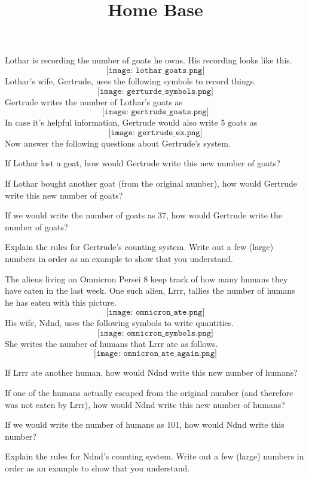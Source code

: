 \documentclass[handout,nooutcomes, noauthor]{ximera}
\title{Home Base}
\begin{document}
\begin{abstract}
\end{abstract}
\maketitle

Lothar is recording the number of goats he owns.  His recording looks like this.
\[
\texttt{[image: lothar\_goats.png]}
\]
Lothar's wife, Gertrude, uses the following symbols to record things.
\[
\texttt{[image: gerturde\_symbols.png]}
\]
Gertrude writes the number of Lothar's goats as
\[
\texttt{[image: gertrude\_goats.png]}
\]
In case it's helpful information, Gertrude would also write 5 goats as
\[
\texttt{[image: gertrude\_ex.png]}
\]
Now answer the following questions about Gertrude's system.
\begin{problem}
If Lothar lost a goat, how would Gertrude write this new number of goats? 
\vfill
\end{problem}
\begin{problem}
If Lothar bought another goat (from the original number), how would Gertrude write this new number of goats? 
\vfill
\end{problem}
\begin{problem}
If we would write the number of goats as 37, how would Gertrude write the number of goats?
\vfill
\end{problem}
\begin{problem}
Explain the rules for Gertrude's counting system.  Write out a few (large) numbers in order as an example to show that you understand.
\vfill
\end{problem}


The aliens living on Omnicron Persei 8 keep track of how many humans they have eaten in the last week.  One such alien, Lrrr, tallies the number of humans he has eaten with this picture.
\[
\texttt{[image: omnicron\_ate.png]}
\]
His wife, Ndnd, uses the following symbols to write quantities.
\[
\texttt{[image: omnicron\_symbols.png]}
\]
She writes the number of humans that Lrrr ate as follows.
\[
\texttt{[image: omnicron\_ate\_again.png]}
\]

\begin{problem}
If Lrrr ate another human, how would Ndnd write this new number of humans? 
\vfill
\end{problem}
\begin{problem}
If one of the humans actually escaped from the original number (and therefore was not eaten by Lrrr), how would Ndnd write this new number of humans? 
\vfill
\end{problem}
\begin{problem}
If we would write the number of humans as 101, how would Ndnd write this number?
\vfill
\end{problem}
\begin{problem}
Explain the rules for Ndnd's counting system.  Write out a few (large) numbers in order as an example to show that you understand.
\vfill
\end{problem}
\end{document}
